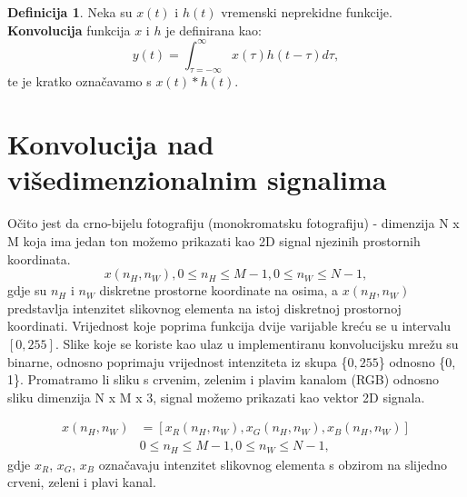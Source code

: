\documentclass[times, utf8, diplomski]{fer}
\theoremstyle{definition}
\newtheorem{definition}{Definicija}[section]
\begin{document}
\begin{definition}
Neka su $x(t)$ i $h(t)$ vremenski neprekidne funkcije. \textbf{Konvolucija} funkcija $x$ i $h$ je definirana kao:
\begin{equation}
y(t) = \int_{\tau=-\infty}^{\infty}x(\tau)h(t-\tau)d\tau,
\end{equation}
te je kratko označavamo s $x(t) * h(t)$.
\end{definition}


\section{Konvolucija nad višedimenzionalnim signalima}
Očito jest da crno-bijelu fotografiju (monokromatsku fotografiju) - dimenzija N x M koja ima jedan ton možemo prikazati kao 2D signal njezinih prostornih koordinata.
\begin{equation}
x(n_H, n_W), 0\le n_H \le M-1, 0\le n_W \le N - 1,
\end{equation}
gdje su $n_H$ i $n_W$ diskretne prostorne koordinate na osima, a $x(n_H, n_W)$ predstavlja intenzitet slikovnog elementa na istoj diskretnoj prostornoj koordinati. Vrijednost koje poprima funkcija dvije varijable kreću se u intervalu $[0, 255]$. Slike koje se koriste kao ulaz u implementiranu konvolucijsku mrežu su binarne, odnosno poprimaju vrijednost intenziteta iz skupa \{$0, 255$\} odnosno \{0, 1\}.\newline
Promatramo li sliku s crvenim, zelenim i plavim kanalom (RGB) odnosno sliku dimenzija N x M x 3, signal možemo prikazati kao vektor 2D signala.

\begin{align*}
x(n_H, n_W) &= [x_R(n_H, n_W), x_G(n_H, n_W), x_B(n_H, n_W)] \\
&0\le n_H \le M-1, 0\le n_W \le N - 1,
\end{align*}
gdje $x_R$, $x_G$, $x_B$ označavaju intenzitet slikovnog elementa s obzirom na slijedno crveni, zeleni i plavi kanal.
\end{document}
